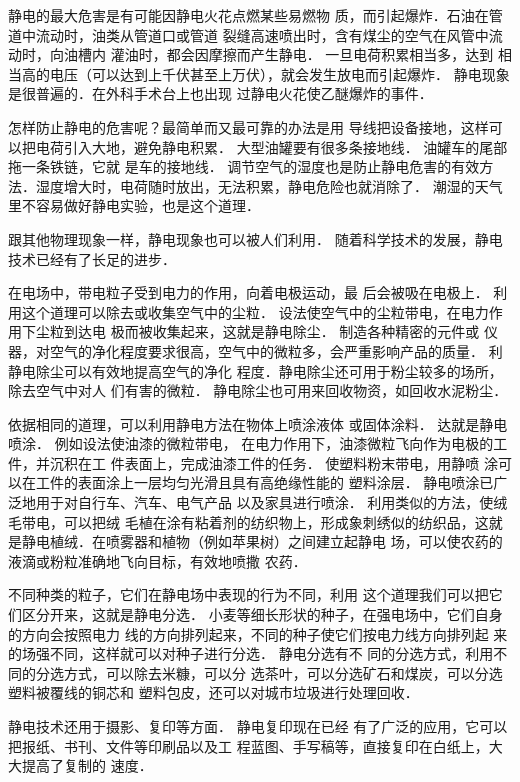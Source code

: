 静电的最大危害是有可能因静电火花点燃某些易燃物
质，而引起爆炸．石油在管道中流动时，油类从管道口或管道
裂缝高速喷出时，含有煤尘的空气在风管中流动时，向油槽内
灌油时，都会因摩擦而产生静电．
一旦电荷积累相当多，达到
相当高的电压（可以达到上千伏甚至上万伏），就会发生放电而引起爆炸．
静电现象是很普遍的．在外科手术台上也出现
过静电火花使乙醚爆炸的事件．

怎样防止静电的危害呢？最简单而又最可靠的办法是用
导线把设备接地，这样可以把电荷引入大地，避免静电积累．
大型油罐要有很多条接地线．
油罐车的尾部拖一条铁链，它就
是车的接地线．
调节空气的湿度也是防止静电危害的有效方
法．湿度增大时，电荷随时放出，无法积累，静电危险也就消除了．
潮湿的天气里不容易做好静电实验，也是这个道理．

跟其他物理现象一样，静电现象也可以被人们利用．
随着科学技术的发展，静电技术已经有了长足的进步．

在电场中，带电粒子受到电力的作用，向着电极运动，最
后会被吸在电极上．
利用这个道理可以除去或收集空气中的尘粒．
设法使空气中的尘粒带电，在电力作用下尘粒到达电
极而被收集起来，这就是静电除尘．
制造各种精密的元件或
仪器，对空气的净化程度要求很高，空气中的微粒多，会严重影响产品的质量．
利静电除尘可以有效地提高空气的净化
程度．静电除尘还可用于粉尘较多的场所，除去空气中对人
们有害的微粒．
静电除尘也可用来回收物资，如回收水泥粉尘．

依据相同的道理，可以利用静电方法在物体上喷涂液体
或固体涂料．
达就是静电喷涂．
例如设法使油漆的微粒带电，
在电力作用下，油漆微粒飞向作为电极的工件，并沉积在工
件表面上，完成油漆工件的任务．
使塑料粉末带电，用静喷
涂可以在工件的表面涂上一层均匀光滑且具有高绝缘性能的
塑料涂层．
静电喷涂已广泛地用于对自行车、汽车、电气产品
以及家具进行喷涂．
利用类似的方法，使绒毛带电，可以把绒
毛植在涂有粘着剂的纺织物上，形成象刺绣似的纺织品，这就
是静电植绒．在喷雾器和植物（例如苹果树）之间建立起静电
场，可以使农药的液滴或粉粒准确地飞向目标，有效地喷撒
农药．

不同种类的粒子，它们在静电场中表现的行为不同，利用
这个道理我们可以把它们区分开来，这就是静电分选．
小麦等细长形状的种子，在强电场中，它们自身的方向会按照电力
线的方向排列起来，不同的种子使它们按电力线方向排列起
来的场强不同，这样就可以对种子进行分选．
静电分选有不
同的分选方式，利用不同的分选方式，可以除去米糠，可以分
选茶叶，可以分选矿石和煤炭，可以分选塑料被覆线的铜芯和
塑料包皮，还可以对城市垃圾进行处理回收．

静电技术还用于摄影、复印等方面．
静电复印现在已经
有了广泛的应用，它可以把报纸、书刊、文件等印刷品以及工
程蓝图、手写稿等，直接复印在白纸上，大大提高了复制的
速度．


